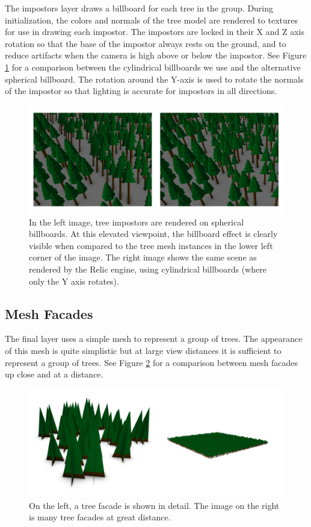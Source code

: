 The impostors layer draws a billboard for each tree in the group.
During initialization, the colors and normals of the tree model are rendered to textures for use in drawing each impostor.
The impostors are locked in their X and Z axis rotation so that the base of the impostor always rests on the ground, and to reduce artifacts when the camera is high above or below the impostor.
See Figure \ref{fig:tree_billboards} for a comparison between the cylindrical billboards we use and the alternative spherical billboard.
The rotation around the Y-axis is used to rotate the normals of the impostor so that lighting is accurate for impostors in all directions.

\begin{figure}
	\centering
		\includegraphics[width=1.0\textwidth]{figures/tree_billboards.jpg}
	\caption{
		In the left image, tree impostors are rendered on spherical billboards.
		At this elevated viewpoint, the billboard effect is clearly visible when compared to the tree mesh instances in the lower left corner of the image.
		The right image shows the same scene as rendered by the Relic engine, using cylindrical billboards (where only the Y axis rotates).
	}
	\label{fig:tree_billboards}
\end{figure}

\subsection{Mesh Facades}

The final layer uses a simple mesh to represent a group of trees.
The appearance of this mesh is quite simplistic but at large view distances it is sufficient to represent a group of trees.
See Figure \ref{fig:tree_facades} for a comparison between mesh facades up close and at a distance.

\begin{figure}
	\centering
		\includegraphics[width=1.0\textwidth]{figures/tree_facades.jpg}
	\caption{
		On the left, a tree facade is shown in detail.
		The image on the right is many tree facades at great distance.
	}
	\label{fig:tree_facades}
\end{figure}

